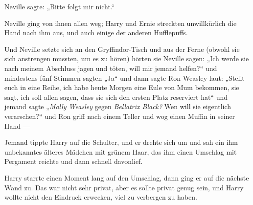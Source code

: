 Neville sagte:
„Bitte folgt mir nicht.“

Neville ging von ihnen allen weg; Harry und Ernie streckten unwillkürlich die Hand nach ihm aus, und auch einige der anderen Hufflepuffs.

Und Neville setzte sich an den Gryffindor-Tisch und aus der Ferne (obwohl sie sich anstrengen mussten, um es zu hören) hörten sie Neville sagen:
„Ich werde sie nach meinem Abschluss jagen und töten, will mir jemand helfen?“ und mindestens fünf Stimmen sagten
„Ja“ und dann sagte Ron Weasley laut:
„Stellt euch in eine Reihe, ich habe heute Morgen eine Eule von Mum bekommen, sie sagt, ich soll allen sagen, dass sie sich den ersten Platz reserviert hat“ und jemand sagte „\emph{Molly Weasley} gegen \emph{Bellatrix Black?} Wen will sie eigentlich verarschen?“ und Ron griff nach einem Teller und wog einen Muffin in seiner Hand —

Jemand tippte Harry auf die Schulter, und er drehte sich um und sah ein ihm unbekanntes älteres Mädchen mit grünem Haar, das ihm einen Umschlag mit Pergament reichte und dann schnell davonlief.

Harry starrte einen Moment lang auf den Umschlag, dann ging er auf die nächste Wand zu. Das war nicht sehr privat, aber es sollte privat genug sein, und Harry wollte nicht den Eindruck erwecken, viel zu verbergen zu haben.

